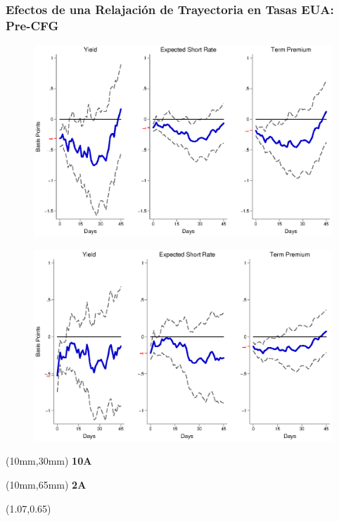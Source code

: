 \documentclass[12pt, aspectratio=169, xcolor=dvipsnames]{beamer}
\begin{document}
\begin{frame}[label=FGUSpre]
\frametitle{Efectos de una Relajación de Trayectoria en Tasas EUA: Pre-CFG}
\begin{figure}[!htbp]
	\begin{center} %
		\includegraphics[trim={0cm 0cm 0cm 0cm},clip,height=0.45\textheight,width=0.85\linewidth]{../Figures/LPs/LagDep-FX/Path/US/PathUSDnomyptp120mPre.eps}
		\par\end{center}
\end{figure}
\vspace{-0.5cm}
\begin{figure}[!htbp]
	\begin{center} %
		\includegraphics[trim={0cm 0cm 0cm 0.76cm},clip,height=0.45\textheight,width=0.85\linewidth]{../Figures/LPs/LagDep-FX/Path/US/PathUSDnomyptp24mPre.eps}
		\par\end{center}
\end{figure}
\begin{textblock*}{8mm}(10mm,30mm)
	\small \textbf{10A}
\end{textblock*}
\begin{textblock*}{8mm}(10mm,65mm)
	\small \textbf{2A}
\end{textblock*}
\begin{textblock*}{5cm}(1.07\textwidth,0.65\textheight)
	\hyperlink{FGEMpre}{}
\end{textblock*}
\end{frame}
\end{document}
